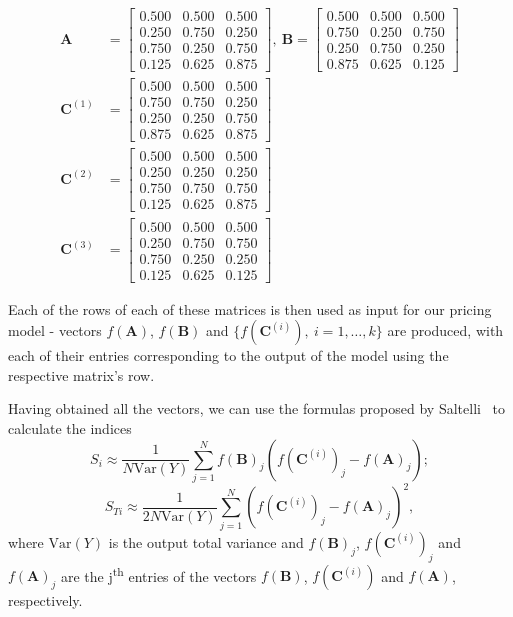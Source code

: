 \documentclass[a4paper,twocolumn,aps,prd,longbibliography,superscriptaddress]{revtex4-1}
\begin{document}
\begin{equation*}
\begin{split}
\mathbf{A}&=
 \begin{bmatrix}
  0.500 & 0.500 & 0.500 \\
  0.250 & 0.750 & 0.250 \\
  0.750 & 0.250  & 0.750 \\
  0.125 & 0.625 & 0.875 
 \end{bmatrix},\ \mathbf{B}=\begin{bmatrix}
  0.500 & 0.500 & 0.500 \\
  0.750 & 0.250 & 0.750 \\
  0.250 & 0.750  & 0.250 \\
  0.875 & 0.625 & 0.125 
 \end{bmatrix}\\
 \mathbf{C}^{(1)}&=
 \begin{bmatrix}
  0.500 & 0.500 & 0.500 \\
  0.750 & 0.750 & 0.250 \\
  0.250 & 0.250  & 0.750 \\
  0.875 & 0.625 & 0.875  
  \end{bmatrix}\\
 \mathbf{C}^{(2)}&=
 \begin{bmatrix}
  0.500 & 0.500 & 0.500 \\
  0.250 & 0.250 & 0.250 \\
  0.750 & 0.750  & 0.750 \\
  0.125 & 0.625 & 0.875  
  \end{bmatrix}\\
  \mathbf{C}^{(3)}&=
 \begin{bmatrix}
  0.500 & 0.500 & 0.500 \\
  0.250 & 0.750 & 0.750 \\
  0.750 & 0.250  & 0.250 \\
  0.125 & 0.625 & 0.125 
   \end{bmatrix}
 \end{split}
\end{equation*}

Each of the rows of each of these matrices is then used as input for our pricing model - vectors $f(\mathbf{A})$, $f(\mathbf{B})$ and $\{f(\mathbf{C}^{(i)}),\ i=1,\dots,k\}$ are produced, with each of their entries corresponding to the output of the model using the respective matrix's row.

Having obtained all the vectors, we can use the formulas proposed by Saltelli~\cite{Saltelli2} to calculate the indices
\begin{equation}\label{Si2}
S_i\approx\frac{1}{N\mathrm{Var}(Y)}\sum_{j=1}^Nf(\mathbf{B})_j\left(f(\mathbf{C}^{(i)})_j-f(\mathbf{A})_j\right);
\end{equation}
\begin{equation}\label{STi2}
S_{Ti}\approx\frac{1}{2N\mathrm{Var}(Y)}\sum_{j=1}^N\left(f(\mathbf{C}^{(i)})_j-f(\mathbf{A})_j\right)^2,
\end{equation}
\noindent where $\mathrm{Var}(Y)$ is the output total variance and $f(\mathbf{B})_j$, $f(\mathbf{C}^{(i)})_j$ and $f(\mathbf{A})_j$ are the j\textsuperscript{th} entries of the vectors $f(\mathbf{B})$, $f(\mathbf{C}^{(i)})$ and $f(\mathbf{A})$, respectively.
\end{document}
